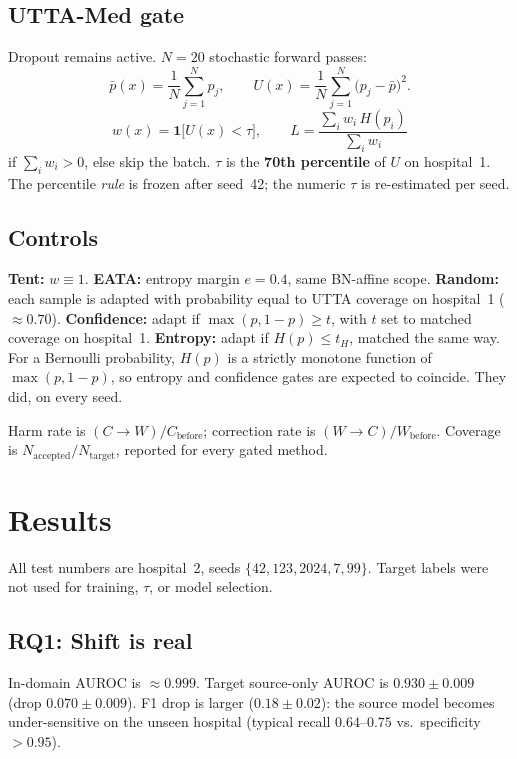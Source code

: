 \documentclass[conference]{IEEEtran}
\begin{document}
\subsection{UTTA-Med gate}
Dropout remains active.
$N=20$ stochastic forward passes:
\begin{equation}
\bar p(x)=\frac1N\sum_{j=1}^N p_j,\qquad
U(x)=\frac1N\sum_{j=1}^N \bigl(p_j-\bar p\bigr)^2.
\end{equation}
\begin{equation}
w(x)=\mathbf{1}\bigl[U(x)<\tau\bigr],\qquad
L=\frac{\sum_i w_i\,H(p_i)}{\sum_i w_i}
\end{equation}
if $\sum_i w_i>0$, else skip the batch.
$\tau$ is the \textbf{70th percentile} of $U$ on hospital~1.
The percentile \emph{rule} is frozen after seed~42; the numeric $\tau$ is re-estimated per seed.

\subsection{Controls}
\textbf{Tent:} $w\equiv 1$.
\textbf{EATA:} entropy margin $e=0.4$, same BN-affine scope.
\textbf{Random:} each sample is adapted with probability equal to UTTA coverage on hospital~1 ($\approx 0.70$).
\textbf{Confidence:} adapt if $\max(p,1-p)\ge t$, with $t$ set to matched coverage on hospital~1.
\textbf{Entropy:} adapt if $H(p)\le t_H$, matched the same way.
For a Bernoulli probability, $H(p)$ is a strictly monotone function of $\max(p,1-p)$, so entropy and confidence gates are expected to coincide. They did, on every seed.

Harm rate is
$(C\!\to\!W)/C_{\mathrm{before}}$;
correction rate is
$(W\!\to\!C)/W_{\mathrm{before}}$.
Coverage is $N_{\mathrm{accepted}}/N_{\mathrm{target}}$, reported for every gated method.

\section{Results}

All test numbers are hospital~2, seeds $\{42,123,2024,7,99\}$.
Target labels were not used for training, $\tau$, or model selection.

\subsection{RQ1: Shift is real}
In-domain AUROC is $\approx 0.999$.
Target source-only AUROC is $\mathbf{0.930\pm0.009}$ (drop $0.070\pm0.009$).
F1 drop is larger ($0.18\pm0.02$): the source model becomes under-sensitive on the unseen hospital (typical recall $0.64$--$0.75$ vs.\ specificity $>0.95$).
\end{document}
